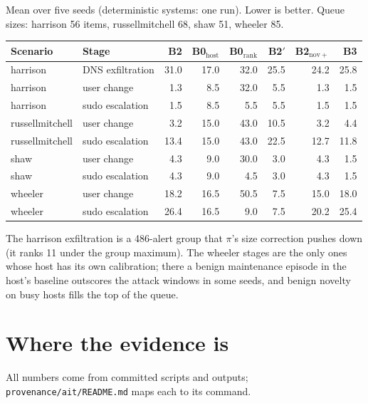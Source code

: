 \documentclass[10.5pt,a4paper]{article}
\begin{document}
Mean over five seeds (deterministic systems: one run). Lower is better. Queue sizes: harrison 56 items, russellmitchell 68, shaw 51, wheeler 85.

\begin{center}\small\setlength{\tabcolsep}{4.5pt}
\begin{tabular}{@{}l l r r r r r r@{}}
\toprule
Scenario & Stage & B2 & B0$_\mathrm{host}$ & B0$_\mathrm{rank}$ & B2$'$ & B2$_\mathrm{nov+}$ & B3 \\
\midrule
harrison & DNS exfiltration & 31.0 & 17.0 & 32.0 & 25.5 & 24.2 & 25.8 \\
harrison & user change & 1.3 & 8.5 & 32.0 & 5.5 & 1.3 & 1.5 \\
harrison & sudo escalation & 1.5 & 8.5 & 5.5 & 5.5 & 1.5 & 1.5 \\
russellmitchell & user change & 3.2 & 15.0 & 43.0 & 10.5 & 3.2 & 4.4 \\
russellmitchell & sudo escalation & 13.4 & 15.0 & 43.0 & 22.5 & 12.7 & 11.8 \\
shaw & user change & 4.3 & 9.0 & 30.0 & 3.0 & 4.3 & 1.5 \\
shaw & sudo escalation & 4.3 & 9.0 & 4.5 & 3.0 & 4.3 & 1.5 \\
wheeler & user change & 18.2 & 16.5 & 50.5 & 7.5 & 15.0 & 18.0 \\
wheeler & sudo escalation & 26.4 & 16.5 & 9.0 & 7.5 & 20.2 & 25.4 \\
\bottomrule
\end{tabular}
\end{center}

\noindent The harrison exfiltration is a 486-alert group that $\pi$'s size correction pushes down (it ranks 11 under the group maximum). The wheeler stages are the only ones whose host has its own calibration; there a benign maintenance episode in the host's baseline outscores the attack windows in some seeds, and benign novelty on busy hosts fills the top of the queue.

\section{Where the evidence is}

All numbers come from committed scripts and outputs; \texttt{provenance/ait/README.md} maps each to its command.
\end{document}
